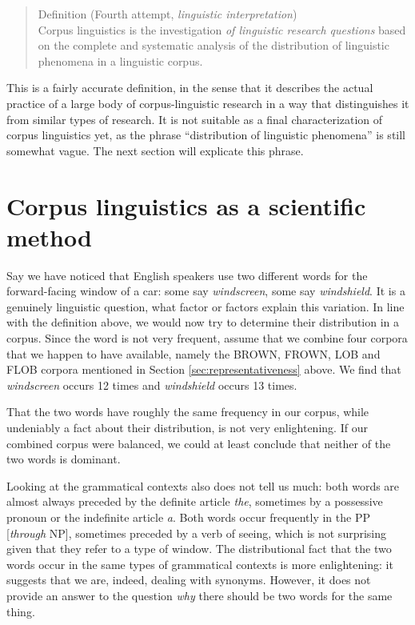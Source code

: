 \begin{quotation}
Definition (Fourth attempt, \emph{linguistic interpretation}) \\
Corpus linguistics is the investigation \emph{of linguistic research questions} based on the complete and systematic analysis of the distribution of linguistic phenomena in a linguistic corpus.
\end{quotation}

This is a fairly accurate definition, in the sense that it describes the actual practice of a large body of corpus-linguistic research in a way that distinguishes it from similar types of research. It is not suitable as a final characterization of corpus linguistics yet, as the phrase ``distribution of linguistic phenomena'' is still somewhat vague. The next section will explicate this phrase.


\section{Corpus linguistics as a scientific method}
\label{sec:corpusscientific}

Say we have noticed that English speakers use two different words for the forward\hyp{}facing window of a car: some say \textit{windscreen}, some say \textit{windshield}. It is a genuinely linguistic question, what factor or factors explain this variation. In line with the definition above, we would now try to determine their distribution in a corpus. Since the word is not very frequent, assume that we combine four corpora that we happen to have available, namely the BROWN, FROWN, LOB and FLOB corpora mentioned in Section \ref{sec:representativeness} above. We find that \textit{windscreen} occurs 12 times and \textit{windshield} occurs 13 times.

That the two words have roughly the same frequency in our corpus, while undeniably a fact about their distribution, is not very enlightening. If our combined corpus were balanced, we could at least conclude that neither of the two words is dominant.

Looking at the grammatical contexts also does not tell us much: both words are almost always preceded by the definite article \textit{the}, sometimes by a possessive pronoun or the indefinite article \textit{a}. Both words occur frequently in the PP [\textit{through} NP], sometimes preceded by a verb of seeing, which is not surprising given that they refer to a type of window. The distributional fact that the two words occur in the same types of grammatical contexts is more enlightening: it suggests that we are, indeed, dealing with synonyms. However, it does not provide an answer to the question \emph{why} there should be two words for the same thing.

